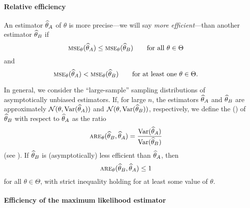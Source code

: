 \paragraph{Relative efficiency}

An estimator $\widehat{\theta}_A$ of $\theta$ is more precise---we will say
\emph{more efficient}---than another estimator $\widehat{\theta}_B$ if
\[
    \stsc{MSE}_{\theta}(\sthat{\theta}_A) \leq 
    \stsc{MSE}_{\theta}(\sthat{\theta}_B)
    \qquad\text{for all $\theta \in \Theta$}
\]
and
\[
    \stsc{MSE}_{\theta}(\sthat{\theta}_A) < 
    \stsc{MSE}_{\theta}(\sthat{\theta}_B)
    \qquad\text{for at least one $\theta \in \Theta$}.
\]


In general, we consider the “large-sample” sampling distributions of
asymptotically unbiased estimators. If, for large $n$, the estimators
$\widehat{\theta}_A$ and $\widehat{\theta}_B$ are approximately
$\mathcal{N}(\theta, \textrm{Var}(\widehat{\theta}_A))$ and
$\mathcal{N}(\theta, \textrm{Var}(\widehat{\theta}_B))$, respectively, we
define the \emph{} () of
$\widehat{\theta}_B$ with respect to $\widehat{\theta}_A$ as the ratio
\[
    \stsc{ARE}_{\theta}(\sthat{\theta}_B,\sthat{\theta}_A) 
    = \frac{ \textrm{Var}(\sthat{\theta}_A)}{\textrm{Var}(\sthat{\theta}_B)}
\]
(see \citealp{Serfling1980}). If $\widehat{\theta}_B$ is (asymptotically) less
efficient than $\widehat{\theta}_A$, then
\[
    \stsc{ARE}_{\theta}(\sthat{\theta}_B,\sthat{\theta}_A) \leq 1
\]
for all $\theta \in \Theta$, with strict inequality holding for at least some
value of $\theta$.


\paragraph{Efficiency of the maximum likelihood estimator}

